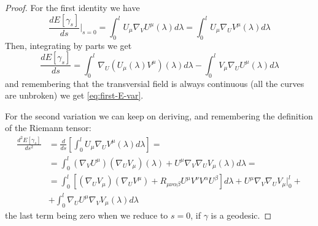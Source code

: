 \begin{proof}
	For the first identity we have
	\begin{equation*}
		\frac{dE[\gamma_s]}{ds}\Big\vert_{s = 0}  = \int_{0}^{l} U_{\mu}\nabla_VU^{\mu}(\lambda) d\lambda = \int_{0}^{l} U_{\mu}\nabla_UV^{\mu}(\lambda) d\lambda
	\end{equation*}
Then, integrating by parts we get 
\begin{equation*}
	\frac{dE[\gamma_s]}{ds} = \int_{0}^{l} \nabla_U\left(U_{\mu}(\lambda)V^{\mu}\right)(\lambda) d\lambda - \int_{0}^{l} V_{\mu}\nabla_UU^{\mu}(\lambda) d\lambda
\end{equation*}
 and remembering that the transversial field is always continuous (all the curves are unbroken) we get \eqref{eq:first-E-var}.
 
 For the second variation we can keep on deriving, and remembering the definition of the Riemann tensor:
 \begin{align*}
 	\frac{d^2E[\gamma_s]}{ds^2} &= \frac{d}{ds} \left[\int_{0}^{l} U_{\mu}\nabla_UV^{\mu}(\lambda) d\lambda\right] = \\
 	&= \int_{0}^{l} (\nabla_VU^{\mu})(\nabla_UV_{\mu})(\lambda) + U^{\mu} \nabla_V\nabla_UV_{\mu} (\lambda) d\lambda=\\
 	&= \int_{0}^{l} \left[(\nabla_UV_{\mu})(\nabla_UV^{\mu}) + R_{\mu\nu\alpha\beta}U^{\mu}V^{\nu}V^{\alpha}U^{\beta}\right] d\lambda + U^{\mu} \nabla_V\nabla_UV_{\mu} \Big\vert_0^l +\\
 	&+  \int_{0}^{l} \nabla_UU^{\mu} \nabla_VV_{\mu} (\lambda) d\lambda
 \end{align*}
	the last term being zero when we reduce to \(s = 0\), if \(\gamma\) is a geodesic.

\end{proof}

